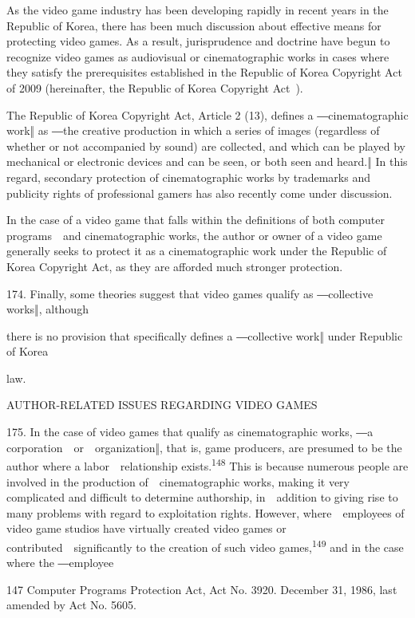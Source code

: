 \documentclass[
]{article}
\begin{document}
{As the video game industry has been developing rapidly in recent years
in the Republic of Korea, there has been much discussion about effective
means for protecting video games. As a result, jurisprudence and
doctrine have begun to recognize video games as audiovisual or
cinematographic works in cases where they satisfy the prerequisites
established in the Republic of Korea }{Copyright Act }{of 2009
(hereinafter, the Republic of Korea }{Copyright Act}{~).}

{The Republic of Korea }{Copyright Act}{, Article 2 (13), defines a
―cinematographic work‖ as ―}{the creative production in which a series
of images (regardless of whether or not accompanied by sound) are
collected, and which can be played by mechanical or electronic devices
and can be seen, or both seen and heard}{.‖ In this regard, secondary
}{protection of cinematographic works by trademarks and publicity rights
of professional gamers has also recently come under discussion.}

{In the case of a video game that falls within the definitions of both
computer programs~~and cinematographic works, the author or owner of a
video game generally seeks to protect it as a cinematographic work under
the Republic of Korea }{Copyright Act}{, as they are afforded much
stronger protection.}

{174. }{Finally, some theories suggest that video games qualify as
―collective works‖, although}

{there is no provision that specifically defines a ―collective work‖
under Republic of Korea}

{law.}

{AUTHOR-RELATED ISSUES REGARDING VIDEO GAMES}

{175. }{In the case of video games that qualify as cinematographic
works, ―}{a corporation~~or~~organization}{‖, that is, game producers,
are presumed to be the }{author }{where a labor~~relationship
exists.}\textsuperscript{{148 }}{This is because numerous people are
involved in the production of~~cinematographic works, making it very
complicated and difficult to determine authorship, in~~addition to
giving rise to many problems with regard to exploitation rights.
However, where~~employees of video game studios have virtually created
video games or contributed~~significantly to the creation of such video
games,}\textsuperscript{{149 }}{and in the case where the ―employee}

{147 }{Computer Programs Protection Act}{, Act No. 3920. December 31,
1986, last amended by Act No. 5605.}
\end{document}
